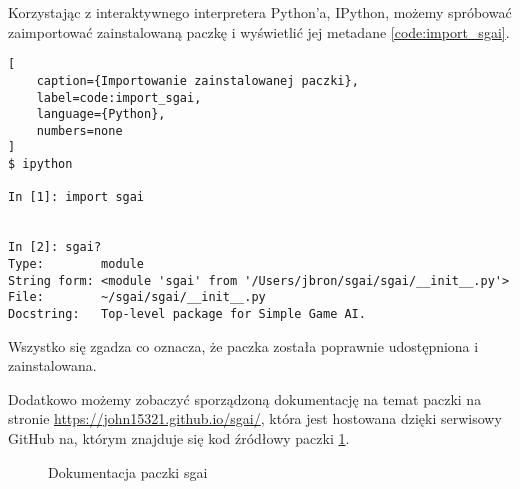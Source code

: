 \clearpage

Korzystając z interaktywnego interpretera Python'a, IPython, możemy spróbować zaimportować zainstalowaną paczkę i wyświetlić jej metadane \ref{code:import_sgai}.

\begin{onepage}
    \begin{lstlisting}[
    caption={Importowanie zainstalowanej paczki},
    label=code:import_sgai,
    language={Python},
    numbers=none
]
$ ipython

In [1]: import sgai


In [2]: sgai?
Type:        module
String form: <module 'sgai' from '/Users/jbron/sgai/sgai/__init__.py'>
File:        ~/sgai/sgai/__init__.py
Docstring:   Top-level package for Simple Game AI.

\end{lstlisting}
\end{onepage}

Wszystko się zgadza co oznacza, że paczka została poprawnie udostępniona i zainstalowana.

Dodatkowo możemy zobaczyć sporządzoną dokumentację na temat paczki na stronie \url{https://john15321.github.io/sgai/}, która jest hostowana dzięki serwisowy GitHub na, którym znajduje się kod źródłowy paczki \ref{img:githubdocs}.


\begin{figure}[h]
    \centering
    \caption{Dokumentacja paczki sgai}
    \label{img:githubdocs}
\end{figure}



